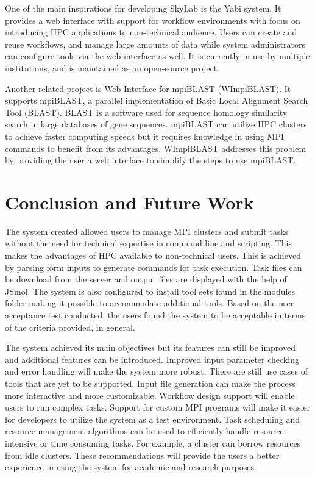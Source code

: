 One of the main inspirations for developing SkyLab is the Yabi system. It provides a web interface with support for workflow environments with focus on introducing HPC applications to non-technical audience. Users can create and reuse workflows, and manage large amounts of data while system administrators can configure tools via the web interface as well. It is currently in use by multiple institutions, and is maintained as an open-source project\cite{7411021620120101}.	    	    
	    
Another related project is Web Interface for mpiBLAST (WImpiBLAST). It supports mpiBLAST, a parallel implementation of Basic Local Alignment Search Tool (BLAST). BLAST is a software used for sequence homology similarity search in large databases of gene sequences. mpiBLAST can utilize HPC clusters to achieve faster computing speeds but it requires knowledge in using MPI commands to benefit from its advantages. WImpiBLAST addresses this problem by providing the user a web interface to simplify the steps to use mpiBLAST\cite{9686120720140601}.   
	
\section{Conclusion and Future Work}
The system created allowed users to manage MPI clusters and submit tasks without the need for technical expertise in command line and scripting. This makes the advantages of HPC available to non-technical users. This is achieved by parsing form inputs to generate commands for task execution. Task files can be download from the server and output files are displayed with the help of JSmol\cite{IJCH:IJCH201300024}. The system is also configured to install tool sets found in the modules folder making it possible to accommodate additional tools. Based on the user acceptance test conducted, the users found the system to be acceptable in terms of the criteria provided, in general. 

The system achieved its main objectives but its features can still be improved and additional features can be introduced. Improved input parameter checking and error handling will make the system more robust. There are still use cases of tools that are yet to be supported. Input file generation can make the process more interactive and more customizable.  Workflow design support will enable users to run complex tasks. Support for custom MPI programs will make it easier for developers to utilize the system as a test environment. Task scheduling and resource management algorithms can be used to efficiently handle resource-intensive or time consuming tasks. For example, a cluster can borrow resources from idle clusters. These recommendations will provide the users a better experience in using the system for academic and research purposes. 

